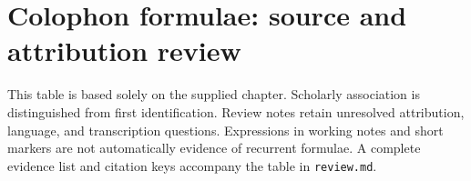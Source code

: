 \documentclass[10pt,a4paper]{article}
\begin{document}
\section*{Colophon formulae: source and attribution review}
This table is based solely on the supplied chapter. Scholarly association is distinguished from first identification. Review notes retain unresolved attribution, language, and transcription questions. Expressions in working notes and short markers are not automatically evidence of recurrent formulae. A complete evidence list and citation keys accompany the table in \texttt{review.md}.

\end{document}
